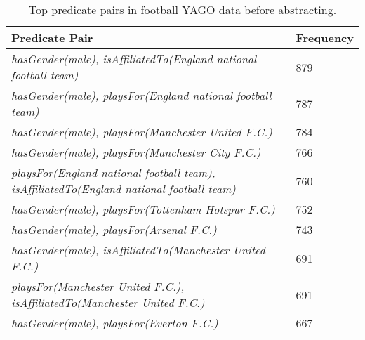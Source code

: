 \documentclass{acm_proc_article-sp}
\begin{document}
\begin{table}[ht]
\caption{Top predicate pairs in football YAGO data before abstracting.}
\label{table5}
\begin{center}
\begin{tabular}{ |p{6cm}|p{1.5cm}| } 
\hline
Predicate Pair & Frequency\\
\hline
\textit{hasGender(male), isAffiliatedTo(England national football team)} & 879 \\
\hline
\textit{hasGender(male), playsFor(England national football team)} & 787 \\
\hline
\textit{hasGender(male), playsFor(Manchester United F.C.)} & 784 \\
\hline
\textit{hasGender(male), playsFor(Manchester City F.C.)} & 766 \\
\hline
\textit{playsFor(England national football team), isAffiliatedTo(England national football team)} & 760 \\
\hline
\textit{hasGender(male), playsFor(Tottenham Hotspur F.C.)} & 752 \\
\hline
\textit{hasGender(male), playsFor(Arsenal F.C.)} & 743 \\
\hline
\textit{hasGender(male), isAffiliatedTo(Manchester United F.C.)} & 691 \\
\hline
\textit{playsFor(Manchester United F.C.), isAffiliatedTo(Manchester United F.C.)} & 691 \\
\hline
\textit{hasGender(male), playsFor(Everton F.C.)} & 667 \\
\hline
\end{tabular}
\end{center}
\end{table}
\end{document}
